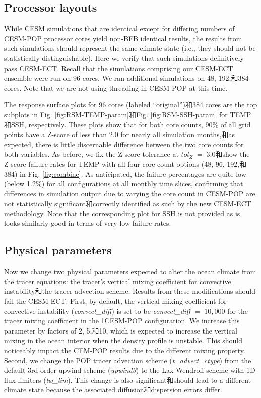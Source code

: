 \subsection{Processor layouts}

While CESM simulations that are identical except for differing numbers of CESM-POP processor cores yield non-BFB identical results, the results from such simulations 
should represent the same climate state (i.e., they should not be statistically distinguishable). Here we verify that such simulations definitively pass CESM-ECT.  Recall that the simulations comprising our CESM-ECT ensemble were run on 96 cores.  We ran additional simulations on 48, 192,和384 cores.  Note that we are not using threading in CESM-POP at this time.

The response surface plots for 96 cores (labeled ``original'')和384 cores are the top subplots in Fig. \ref{fig:RSM-TEMP-param}和Fig. \ref{fig:RSM-SSH-param} for TEMP和SSH, respectively. These plots show that for both core counts, 90\% of all grid points have a Z-score of less than 2.0 for nearly all simulation months,和as expected, there is little discernable difference between the two core counts for both variables.  As before, we fix the Z-score tolerance at $tol_{Z} \; = \; 3.0$和show the Z-score failure rates for TEMP with all four core count options (48, 96, 192,和384) in Fig. \ref{fig:combine}.  As anticipated, the failure percentages are quite low (below 1.2\%) for all configurations at all monthly time slices, confirming that differences in simulation output due to varying the core count in CESM-POP are not statistically significant和correctly identified as such by the new CESM-ECT methodology.  Note that the corresponding plot for SSH is not provided as is looks similarly good in terms of very low failure rates.

 \subsection{Physical parameters}\label{sec:pp}

 Now we change two physical parameters expected to alter the ocean climate from the tracer equations: the tracer's vertical mixing coefficient for convective instability和the tracer advection scheme.  Results from these modifications should fail the CESM-ECT. First, by default, the vertical mixing coefficient for convective instability (\textit{convect\_diff}) is set to be \textit{convect\_diff} $=\; 10,000$ for the tracer mixing coefficient in the 1\degree CESM-POP configuration.  We increase this parameter by factors of 2, 5,和10, which is expected to increase the vertical mixing in the ocean interior when the density profile is unstable. This should noticeably impact the CEM-POP results due to the different mixing property.  Second, we change the POP tracer advection scheme (\textit{t\_advect\_ctype}) from the default 3rd-order upwind scheme (\textit{upwind3}) to the Lax-Wendroff scheme with 1D flux limiters (\textit{lw\_lim}). This change is also significant和should lead to a different climate state because the associated diffusion和dispersion errors differ.

